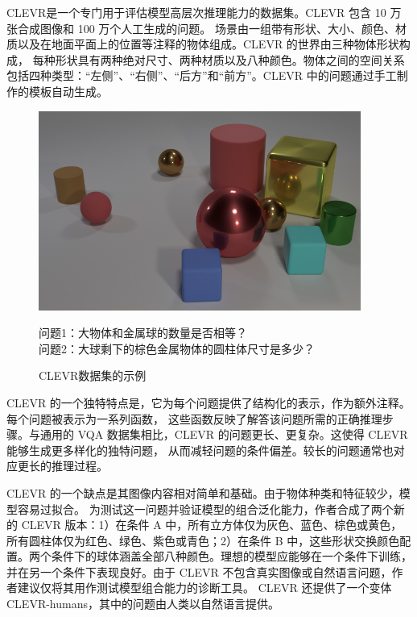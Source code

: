 CLEVR\cite{johnson2017clevr}是一个专门用于评估模型高层次推理能力的数据集。CLEVR 包含 10 万张合成图像和 100 万个人工生成的问题。
场景由一组带有形状、大小、颜色、材质以及在地面平面上的位置等注释的物体组成。CLEVR 的世界由三种物体形状构成，
每种形状具有两种绝对尺寸、两种材质以及八种颜色。物体之间的空间关系包括四种类型：“左侧”、“右侧”、“后方”和“前方”。CLEVR 中的问题通过手工制作的模板自动生成。
\begin{figure}[h]
    \centering
    \includegraphics[scale=0.5]{figures/clevr-example.png}
    \begin{center}
        \footnotesize 问题1：大物体和金属球的数量是否相等？\\
        \footnotesize 问题2：大球剩下的棕色金属物体的圆柱体尺寸是多少？\\
    \end{center}
    \caption{CLEVR数据集的示例}
    \label{fig:clevr-example}
\end{figure}
CLEVR 的一个独特特点是，它为每个问题提供了结构化的表示，作为额外注释。每个问题被表示为一系列函数，
这些函数反映了解答该问题所需的正确推理步骤。与通用的 VQA 数据集相比，CLEVR 的问题更长、更复杂。这使得 CLEVR 能够生成更多样化的独特问题，
从而减轻问题的条件偏差。较长的问题通常也对应更长的推理过程。

CLEVR 的一个缺点是其图像内容相对简单和基础。由于物体种类和特征较少，模型容易过拟合。
为测试这一问题并验证模型的组合泛化能力，作者合成了两个新的 CLEVR 版本：1）在条件 A 中，所有立方体仅为灰色、蓝色、棕色或黄色，
所有圆柱体仅为红色、绿色、紫色或青色；2）在条件 B 中，这些形状交换颜色配置。两个条件下的球体涵盖全部八种颜色。理想的模型应能够在一个条件下训练，
并在另一个条件下表现良好。由于 CLEVR 不包含真实图像或自然语言问题，作者建议仅将其用作测试模型组合能力的诊断工具。
CLEVR 还提供了一个变体 CLEVR-humans，其中的问题由人类以自然语言提供。
